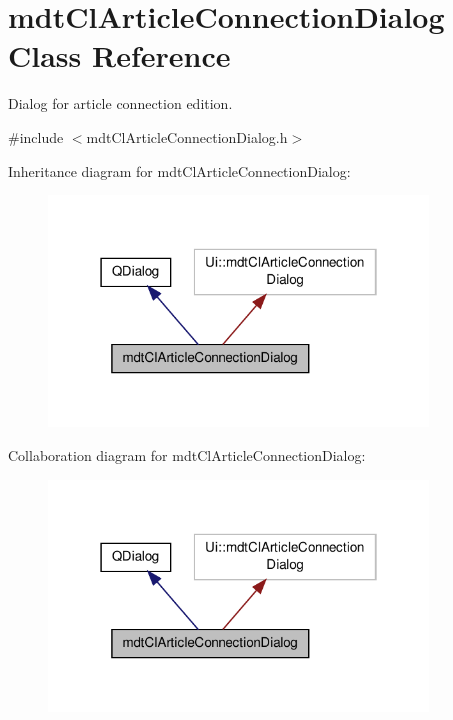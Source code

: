 \hypertarget{classmdt_cl_article_connection_dialog}{\section{mdt\-Cl\-Article\-Connection\-Dialog Class Reference}
\label{classmdt_cl_article_connection_dialog}
}


Dialog for article connection edition.  




{\ttfamily \#include $<$mdt\-Cl\-Article\-Connection\-Dialog.\-h$>$}



Inheritance diagram for mdt\-Cl\-Article\-Connection\-Dialog\-:\nopagebreak
\begin{figure}[H]
\begin{center}
\leavevmode
\includegraphics[width=286pt]{classmdt_cl_article_connection_dialog__inherit__graph}
\end{center}
\end{figure}


Collaboration diagram for mdt\-Cl\-Article\-Connection\-Dialog\-:\nopagebreak
\begin{figure}[H]
\begin{center}
\leavevmode
\includegraphics[width=286pt]{classmdt_cl_article_connection_dialog__coll__graph}
\end{center}
\end{figure}
